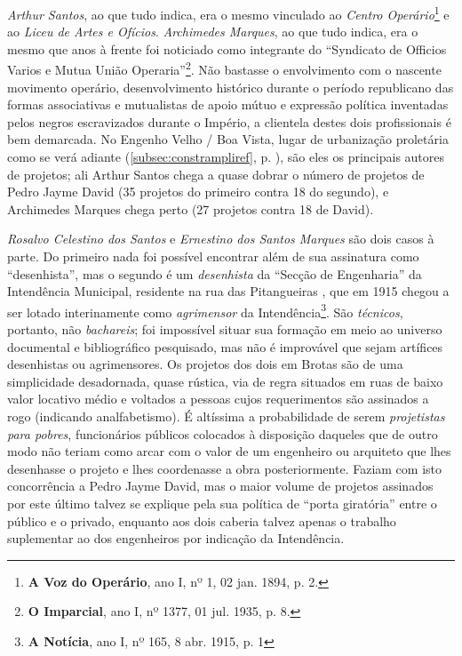 \textit{Arthur Santos}, ao que tudo indica, era o mesmo vinculado ao \textit{Centro Operário}\footnote{\textbf{A Voz do Operário}, ano I, nº 1, 02 jan. 1894, p. 2.} e ao \textit{Liceu de Artes e Ofícios}. \textit{Archimedes Marques}, ao que tudo indica, era o mesmo que anos à frente foi noticiado como integrante do ``Syndicato de Officios Varios e Mutua União Operaria''\footnote{\textbf{O Imparcial}, ano I, nº 1377, 01 jul. 1935, p. 8.}. Não bastasse o envolvimento com o nascente movimento operário, desenvolvimento histórico durante o período republicano das formas associativas e mutualistas de apoio mútuo e expressão política inventadas pelos negros escravizados durante o Império, a clientela destes dois profissionais é bem demarcada. No Engenho Velho / Boa Vista, lugar de urbanização proletária como se verá adiante (\autoref{subsec:constrampliref}, p. \pageref{subsec:constrampliref}), são eles os principais autores de projetos; ali Arthur Santos chega a quase dobrar o número de projetos de Pedro Jayme David (35 projetos do primeiro contra 18 do segundo), e Archimedes Marques chega perto (27 projetos contra 18 de David).

\textit{Rosalvo Celestino dos Santos} e \textit{Ernestino dos Santos Marques} são dois casos à parte. Do primeiro nada foi possível encontrar além de sua assinatura como ``desenhista'', mas o segundo é um \textit{desenhista} da ``Secção de Engenharia'' da Intendência Municipal, residente na rua das Pitangueiras \cite[p.~279]{reis_almanak_1898}, que em 1915 chegou a ser lotado interinamente como \textit{agrimensor} da Intendência\footnote{\textbf{A Notícia}, ano I, nº 165, 8 abr. 1915, p. 1}. São \textit{técnicos}, portanto, não \textit{bachareis}; foi impossível situar sua formação em meio ao universo documental e bibliográfico pesquisado, mas não é improvável que sejam artífices desenhistas ou agrimensores. Os projetos dos dois em Brotas são de uma simplicidade desadornada, quase rústica, via de regra situados em ruas de baixo valor locativo médio e voltados a pessoas cujos requerimentos são assinados a rogo (indicando analfabetismo). É altíssima a probabilidade de serem \textit{projetistas para pobres}, funcionários públicos colocados à disposição daqueles que de outro modo não teriam como arcar com o valor de um engenheiro ou arquiteto que lhes desenhasse o projeto e lhes coordenasse a obra posteriormente. Faziam com isto concorrência a Pedro Jayme David, mas o maior volume de projetos assinados por este último talvez se explique pela sua política de ``porta giratória'' entre o público e o privado, enquanto aos dois caberia talvez apenas o trabalho suplementar ao dos engenheiros por indicação da Intendência.

